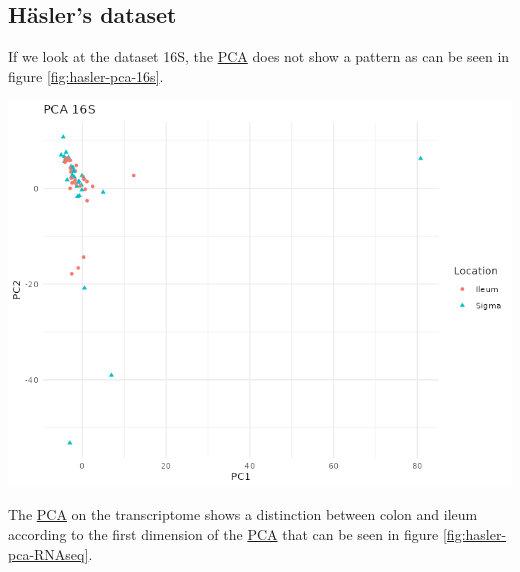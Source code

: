 \documentclass[
  12pt,
  a4paper,
  twoside,
  openright]{book}
\let\origfigure\figure
\let\endorigfigure\endfigure
\renewenvironment{figure}[1][2] {
    \expandafter\origfigure\expandafter[!htbp]
} {
    \endorigfigure
}
\begin{document}
\FloatBarrier

\hypertarget{results-hasler}{%
\subsection{Häsler's dataset}\label{results-hasler}}

If we look at the dataset 16S, the \protect\hyperlink{acronyms_PCA}{PCA} does not show a pattern as can be seen in figure \ref{fig:hasler-pca-16s}.

\begin{figure}
\includegraphics[width=1\linewidth]{images/hasler_PCA_16S} \caption[PCA of 16S of the Häsler's dataset.]{PCA of 16S of Häsler's dataset. There are some samples that are very different from the others. Each point represents a sample (colored and shaped by location).}\label{fig:hasler-pca-16s}
\end{figure}

The \protect\hyperlink{acronyms_PCA}{PCA} on the transcriptome shows a distinction between colon and ileum according to the first dimension of the \protect\hyperlink{acronyms_PCA}{PCA} that can be seen in figure \ref{fig:hasler-pca-RNAseq}.
\end{document}
